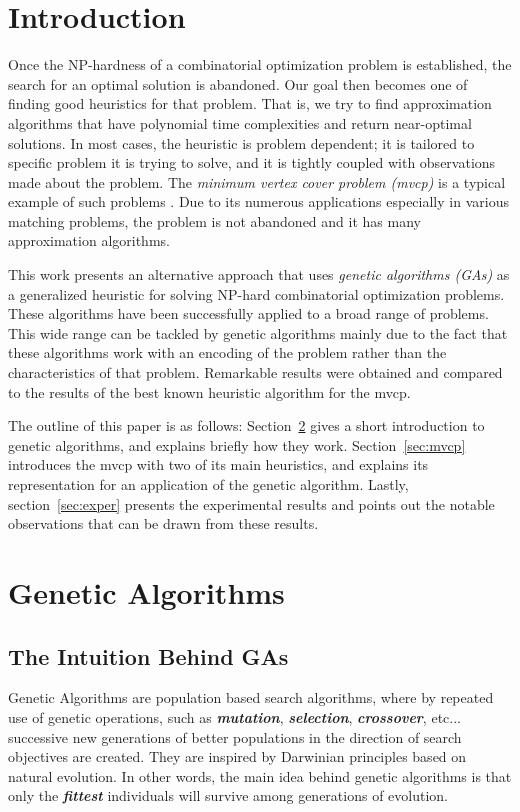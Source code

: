 \documentclass[12pt]{article}
\newcommand{\textem}[1]{\textbf{\emph{#1}}}
\begin{document}
\pagebreak



\section{Introduction}
\label{sec:intro}
Once the NP-hardness of a combinatorial optimization
problem is established, the search for an optimal solution
is abandoned.
Our goal then becomes one of finding good heuristics
for that problem.
That is, we try to find approximation algorithms
that have polynomial time complexities and return near-optimal
solutions.
In most cases, the heuristic is problem dependent; it is tailored to specific problem
it is trying to solve, and it is tightly coupled with observations made about the problem.
The \textit{minimum vertex cover problem (mvcp)} is a typical example of such
problems \cite{wolfram:mvc}.
Due to its numerous applications especially in various
matching problems, the problem is not abandoned and it has many
approximation algorithms.

This work presents an alternative approach that
uses \textit{genetic algorithms (GAs)} as a generalized heuristic for
solving NP-hard combinatorial optimization problems.
These algorithms have been successfully applied to a broad
range of problems.
This wide range can be tackled by genetic algorithms
mainly due to the fact that these algorithms work with an
encoding of the problem rather than the characteristics
of that problem.
Remarkable results were obtained and compared to the results of the
best known heuristic algorithm for the mvcp.

The outline of this paper is as follows: Section~\ref{sec:ga} gives a
short introduction to genetic algorithms, and explains briefly how they work.
Section~\ref{sec:mvcp} introduces the mvcp with two of its main heuristics,
and explains its representation for an application of the genetic algorithm.
Lastly, section~\ref{sec:exper} presents the experimental results and
points out the notable observations that can be drawn from these results.



\section{Genetic Algorithms}
\label{sec:ga}
\subsection{The Intuition Behind GAs}
Genetic Algorithms \cite{coley, goldberg} are population based
search algorithms, where by repeated use of genetic operations,
such as \textem{mutation}, \textem{selection}, \textem{crossover}, etc...
successive new generations of better populations in the direction of
search objectives are created.
They are inspired by Darwinian principles
based on natural evolution.
In other words, the main idea behind genetic
algorithms is that only the \textem{fittest} individuals will survive
among generations of evolution.
\end{document}
